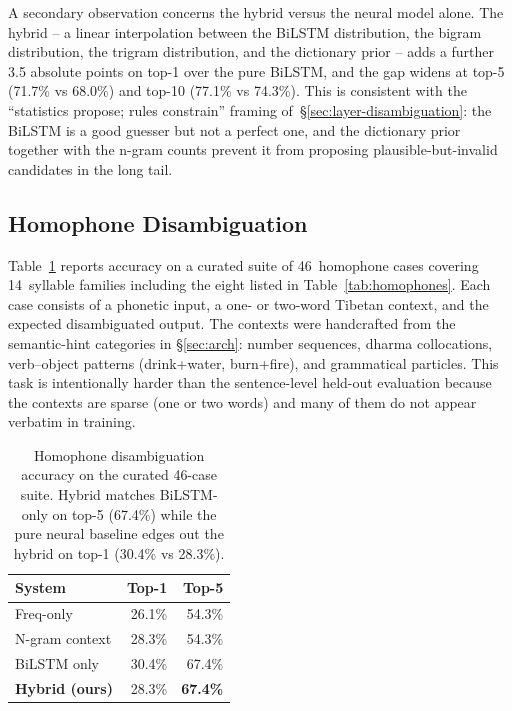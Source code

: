 \documentclass[11pt]{article}
\begin{document}
A secondary observation concerns the hybrid versus the neural model alone. The hybrid -- a linear interpolation between the BiLSTM distribution, the bigram distribution, the trigram distribution, and the dictionary prior -- adds a further 3.5 absolute points on top-1 over the pure BiLSTM, and the gap widens at top-5 (71.7\% vs 68.0\%) and top-10 (77.1\% vs 74.3\%). This is consistent with the ``statistics propose; rules constrain'' framing of~\S\ref{sec:layer-disambiguation}: the BiLSTM is a good guesser but not a perfect one, and the dictionary prior together with the n-gram counts prevent it from proposing plausible-but-invalid candidates in the long tail.

\subsection{Homophone Disambiguation}

Table~\ref{tab:homophone-results} reports accuracy on a curated suite of 46~homophone cases covering 14~syllable families including the eight listed in Table~\ref{tab:homophones}. Each case consists of a phonetic input, a one- or two-word Tibetan context, and the expected disambiguated output. The contexts were handcrafted from the semantic-hint categories in \S\ref{sec:arch}: number sequences, dharma collocations, verb--object patterns (drink+water, burn+fire), and grammatical particles. This task is intentionally harder than the sentence-level held-out evaluation because the contexts are sparse (one or two words) and many of them do not appear verbatim in training.

\begin{table}[t]
\centering
\small
\begin{tabular}{lrr}
\toprule
System & Top-1 & Top-5 \\
\midrule
Freq-only              & 26.1\% & 54.3\% \\
N-gram context         & 28.3\% & 54.3\% \\
BiLSTM only            & 30.4\% & 67.4\% \\
\textbf{Hybrid (ours)} & 28.3\% & \textbf{67.4\%} \\
\bottomrule
\end{tabular}
\caption{Homophone disambiguation accuracy on the curated 46-case suite. Hybrid matches BiLSTM-only on top-5 (67.4\%) while the pure neural baseline edges out the hybrid on top-1 (30.4\% vs 28.3\%).}
\label{tab:homophone-results}
\end{table}
\end{document}
